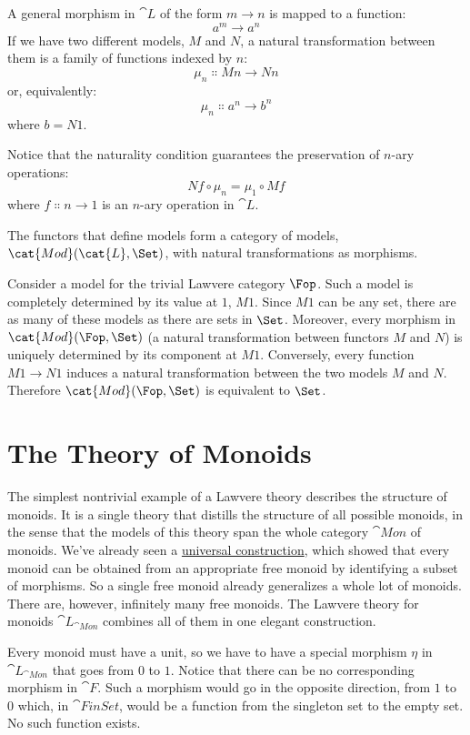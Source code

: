 A general morphism in $\cat{L}$ of the form
$m \to n$ is mapped to a function:
\[a^m \to a^n\]
If we have two different models, $M$ and $N$, a natural
transformation between them is a family of functions indexed by
$n$:
\[\mu_n \Colon M n \to N n\]
or, equivalently:
\[\mu_n \Colon a^n \to b^n\]
where $b = N 1$.

Notice that the naturality condition guarantees the preservation of
$n$-ary operations:
\[N f \circ \mu_n = \mu_1 \circ M f\]
where $f \Colon n \to 1$ is an $n$-ary operation in
$\cat{L}$.

The functors that define models form a category of models,
$\cat{Mod}(\cat{L}, \Set)$, with natural transformations as morphisms.

Consider a model for the trivial Lawvere category
$\Fop$. Such a model is completely determined by
its value at $1$, $M 1$. Since $M 1$ can be any
set, there are as many of these models as there are sets in
$\Set$. Moreover, every morphism in $\cat{Mod}(\Fop, \Set)$ (a
natural transformation between functors $M$ and $N$) is
uniquely determined by its component at $M 1$. Conversely, every
function $M 1 \to N 1$ induces a natural
transformation between the two models $M$ and $N$.
Therefore $\cat{Mod}(\Fop, \Set)$ is equivalent to $\Set$.

\section{The Theory of Monoids}

The simplest nontrivial example of a Lawvere theory describes the
structure of monoids. It is a single theory that distills the structure
of all possible monoids, in the sense that the models of this theory
span the whole category $\cat{Mon}$ of monoids. We've already seen a
\hyperref[free-monoids]{universal
  construction}, which showed that every monoid can be obtained from an
appropriate free monoid by identifying a subset of morphisms. So a
single free monoid already generalizes a whole lot of monoids. There
are, however, infinitely many free monoids. The Lawvere theory for
monoids $\cat{L}_{\cat{Mon}}$ combines all of them in one
elegant construction.

Every monoid must have a unit, so we have to have a special morphism
$\eta$ in $\cat{L}_{\cat{Mon}}$ that goes from $0$ to
$1$. Notice that there can be no corresponding morphism in
$\cat{F}$. Such a morphism would go in the opposite direction, from
$1$ to $0$ which, in $\cat{FinSet}$, would be a function
from the singleton set to the empty set. No such function exists.

